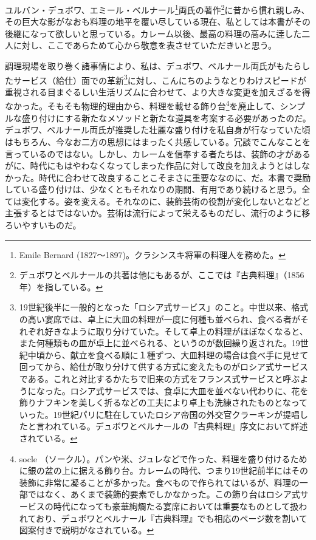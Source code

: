 \begin{main}
ユルバン・デュボワ、エミール・ベルナール\footnote{Emile Bernard
  (1827〜1897)。クラシンスキ将軍の料理人を務めた。}両氏の著作\footnote{デュボワとベルナールの共著は他にもあるが、ここでは『古典料理』（1856年）を指している。}に昔から慣れ親しみ、その巨大な影がなおも料理の地平を覆い尽している現在、私としては本書がその後継になって欲しいと思っている。カレーム以後、最高の料理の高みに逹した二人に対し、ここであらためて心から敬意を表させていただきいと思う。

調理現場を取り巻く諸事情により、私は、デュボワ、ベルナール両氏がもたらしたサービス（給仕）面での革新\footnote{19世紀後半に一般的となった「ロシア式サービス」のこと。中世以来、格式の高い宴席では、卓上に大皿の料理が一度に何種も並べられ、食べる者がそれぞれ好きなように取り分けていた。そして卓上の料理がほぼなくなると、また何種類もの皿が卓上に並べられる、というのが数回繰り返された。19世紀中頃から、献立を食べる順に１種ずつ、大皿料理の場合は食べ手に見せて回ってから、給仕が取り分けて供する方式に変えたものがロシア式サービスである。これと対比するかたちで旧来の方式をフランス式サービスと呼ぶようになった。ロシア式サービスでは、食卓に大皿を並べない代わりに、花を飾りナフキンを美しく折るなどの工夫により卓上も洗練されたものとなっていった。19世紀パリに駐在していたロシア帝国の外交官クラーキンが提唱したと言われている。デュボワとベルナールの『古典料理』序文において詳述されている。}に対し、こんにちのようなとりわけスピードが重視される目まぐるしい生活リズムに合わせて、より大きな変更を加えざるを得なかった。そもそも物理的理由から、料理を載せる飾り台\footnote{socle
  （ソークル）。パンや米、ジュレなどで作った、料理を盛り付けるために銀の盆の上に据える飾り台。カレームの時代、つまり19世紀前半にはその装飾に非常に凝ることが多かった。食べもので作られてはいるが、料理の一部ではなく、あくまで装飾的要素でしかなかった。この飾り台はロシア式サービスの時代になっても豪華絢爛たる宴席においては重要なものとして扱われており、デュボワとベルナール『古典料理』でも相応のページ数を割いて図案付きで説明がなされている。}を廃止して、シンプルな盛り付けにする新たなメソッドと新たな道具を考案する必要があったのだ。デュボワ、ベルナール両氏が推奨した壮麗な盛り付けを私自身が行なっていた頃はもちろん、今なお二方の思想にはまったく共感している。冗談でこんなことを言っているのではない。しかし、カレームを信奉する者たちは、装飾の才があるがに、時代にもはやわなくなってしまった作品に対して改良を加えようとはしなかった。時代に合わせて改良することこそまさに重要ななのに、だ。本書で奨励している盛り付けは、少なくともそれなりの期間、有用であり続けると思う。全ては変化する。姿を変える。それなのに、装飾芸術の役割が変化しないとなどと主張するとはではないか。芸術は流行によって栄えるものだし、流行のように移ろいやすいものだ。


\end{main}
